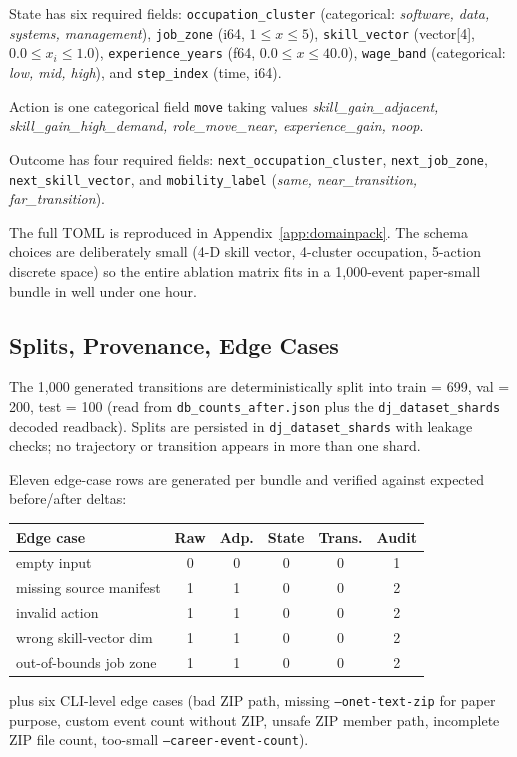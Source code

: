 \documentclass[10pt,twocolumn,letterpaper]{article}
\newcommand{\code}[1]{\texttt{\small #1}}
\begin{document}
State has six required fields: \code{occupation\_cluster}
(categorical: \emph{software, data, systems, management}),
\code{job\_zone} (i64, $1{\le}x{\le}5$), \code{skill\_vector}
(vector[4], $0.0{\le}x_i{\le}1.0$), \code{experience\_years}
(f64, $0.0{\le}x{\le}40.0$), \code{wage\_band} (categorical:
\emph{low, mid, high}), and \code{step\_index} (time, i64).

Action is one categorical field \code{move} taking values
\emph{skill\_gain\_adjacent, skill\_gain\_high\_demand,
role\_move\_near, experience\_gain, noop}.

Outcome has four required fields: \code{next\_occupation\_cluster},
\code{next\_job\_zone}, \code{next\_skill\_vector}, and
\code{mobility\_label} (\emph{same, near\_transition,
far\_transition}).

The full TOML is reproduced in Appendix~\ref{app:domainpack}. The
schema choices are deliberately small (4-D skill vector, 4-cluster
occupation, 5-action discrete space) so the entire ablation matrix
fits in a 1{,}000-event paper-small bundle in well under one hour.

\subsection{Splits, Provenance, Edge Cases}

The 1{,}000 generated transitions are deterministically split into
train = 699, val = 200, test = 100 (read from
\code{db\_counts\_after.json} plus the \code{dj\_dataset\_shards}
decoded readback). Splits are persisted in
\code{dj\_dataset\_shards} with leakage checks; no trajectory or
transition appears in more than one shard.

Eleven edge-case rows are generated per bundle and verified
against expected before/after deltas:
\begin{center}\footnotesize
\renewcommand{\arraystretch}{1.1}
\begin{tabular}{@{}lccccc@{}}
\toprule
\textbf{Edge case} & \textbf{Raw} & \textbf{Adp.} & \textbf{State} & \textbf{Trans.} & \textbf{Audit} \\
\midrule
empty input              & 0 & 0 & 0 & 0 & 1 \\
missing source manifest  & 1 & 1 & 0 & 0 & 2 \\
invalid action           & 1 & 1 & 0 & 0 & 2 \\
wrong skill-vector dim   & 1 & 1 & 0 & 0 & 2 \\
out-of-bounds job zone   & 1 & 1 & 0 & 0 & 2 \\
\bottomrule
\end{tabular}
\end{center}
plus six CLI-level edge cases (bad ZIP path, missing
\code{--onet-text-zip} for paper purpose, custom event count
without ZIP, unsafe ZIP member path, incomplete ZIP file count,
too-small \code{--career-event-count}).
\end{document}
